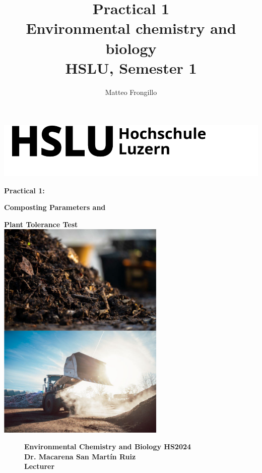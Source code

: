 \documentclass{article}
\title{\textbf{Practical 1 \\ Environmental chemistry and biology \\ HSLU, Semester 1}}
\author{Matteo Frongillo}
\begin{document}
\hypersetup{citecolor=black}

\begin{minipage}{0.7\textwidth}
    \vspace*{-.8cm} \hspace*{-0.3cm}
    \includegraphics[width=.5\textwidth]{media/hslu-logo.png}
\end{minipage}

\vspace*{2cm}

\textbf{\huge Practical 1:}\\[.75cm]
\begin{center}
    \textbf{\huge Composting Parameters and}
    
    \textbf{\huge Plant Tolerance Test}\\[1cm]
    
    \includegraphics[width=0.6\textwidth]{media/front_practical1.png}\\
\end{center}

\vspace*{1cm}

\setlength{\intextsep}{0pt}%
\begin{figure}
    \textbf{\Large Environmental Chemistry and Biology HS2024\\[.5cm]
    \large Dr. Macarena San Martín Ruiz\\
    Lecturer}
    \vspace{-2.1cm}
\end{figure}
\end{document}
